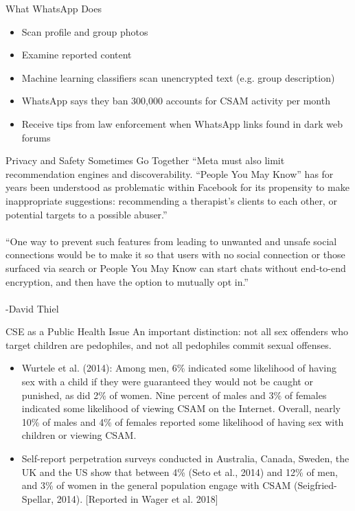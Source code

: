 \documentclass[nobackground,dvipsnames,table,aspectratio=169]{beamer}
\begin{document}
\begin{frame}{What WhatsApp Does}
    \begin{itemize}
        \item Scan profile and group photos
        \item Examine reported content
        \item Machine learning classifiers scan unencrypted text (e.g. group description)
        \item WhatsApp says they ban 300,000 accounts for CSAM activity per month
        \item Receive tips from law enforcement when WhatsApp links found in dark web forums
    \end{itemize}
\end{frame}

\begin{frame}{Privacy and Safety Sometimes Go Together}
    “Meta must also limit recommendation engines and discoverability. “People You May Know” has for years been understood as problematic within Facebook for its propensity to make inappropriate suggestions: recommending a therapist’s clients to each other, or potential targets to a possible abuser.”\\~\\
    “One way to prevent such features from leading to unwanted and unsafe social connections would be to make it so that users with no social connection or those surfaced via search or People You May Know can start chats without end-to-end encryption, and then have the option to mutually opt in.”\\~\\
    -David Thiel
\end{frame}

\begin{frame}{CSE as a Public Health Issue}
    An important distinction: not all sex offenders who target children are pedophiles, and not all pedophiles commit sexual offenses.
    \begin{itemize}
        \item Wurtele et al. (2014): Among men, 6\% indicated some likelihood of having sex with a child if they were guaranteed they would not be caught or punished, as did 2\% of women. Nine percent of males and 3\% of females indicated some likelihood of viewing CSAM on the Internet. Overall, nearly 10\% of males and 4\% of females reported some likelihood of having sex with children or viewing CSAM.
        \item Self-report perpetration surveys conducted in Australia, Canada, Sweden, the UK and the US show that between 4\% (Seto et al., 2014) and 12\% of men, and 3\% of women in the general population engage with CSAM (Seigfried-Spellar, 2014). [Reported in Wager et al. 2018]
    \end{itemize}
\end{frame}
\end{document}
